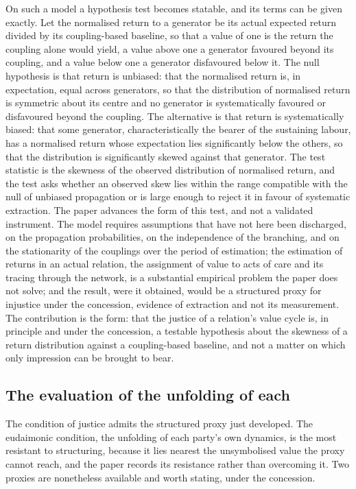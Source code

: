 On such a model a hypothesis test becomes statable, and its terms can be given exactly. Let the normalised return to a generator be its actual expected return divided by its coupling-based baseline, so that a value of one is the return the coupling alone would yield, a value above one a generator favoured beyond its coupling, and a value below one a generator disfavoured below it. The null hypothesis is that return is unbiased: that the normalised return is, in expectation, equal across generators, so that the distribution of normalised return is symmetric about its centre and no generator is systematically favoured or disfavoured beyond the coupling. The alternative is that return is systematically biased: that some generator, characteristically the bearer of the sustaining labour, has a normalised return whose expectation lies significantly below the others, so that the distribution is significantly skewed against that generator. The test statistic is the skewness of the observed distribution of normalised return, and the test asks whether an observed skew lies within the range compatible with the null of unbiased propagation or is large enough to reject it in favour of systematic extraction. The paper advances the form of this test, and not a validated instrument. The model requires assumptions that have not here been discharged, on the propagation probabilities, on the independence of the branching, and on the stationarity of the couplings over the period of estimation; the estimation of returns in an actual relation, the assignment of value to acts of care and its tracing through the network, is a substantial empirical problem the paper does not solve; and the result, were it obtained, would be a structured proxy for injustice under the concession, evidence of extraction and not its measurement. The contribution is the form: that the justice of a relation's value cycle is, in principle and under the concession, a testable hypothesis about the skewness of a return distribution against a coupling-based baseline, and not a matter on which only impression can be brought to bear.



\subsection{The evaluation of the unfolding of each}
\label{p11:sec:ev-dynamics}

The condition of justice admits the structured proxy just developed. The eudaimonic condition, the unfolding of each party's own dynamics, is the most resistant to structuring, because it lies nearest the unsymbolised value the proxy cannot reach, and the paper records its resistance rather than overcoming it. Two proxies are nonetheless available and worth stating, under the concession.

